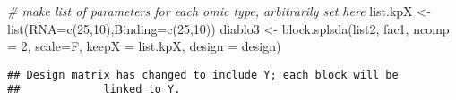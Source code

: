 \documentclass[
]{article}
\newenvironment{Shaded}{\begin{snugshade}}{\end{snugshade}}
\newcommand{\AttributeTok}[1]{\textcolor[rgb]{0.77,0.63,0.00}{#1}}
\newcommand{\CommentTok}[1]{\textcolor[rgb]{0.56,0.35,0.01}{\textit{#1}}}
\newcommand{\DecValTok}[1]{\textcolor[rgb]{0.00,0.00,0.81}{#1}}
\newcommand{\FunctionTok}[1]{\textcolor[rgb]{0.00,0.00,0.00}{#1}}
\newcommand{\NormalTok}[1]{#1}
\newcommand{\OtherTok}[1]{\textcolor[rgb]{0.56,0.35,0.01}{#1}}
\begin{document}
\begin{Shaded}
\begin{Highlighting}[]
\CommentTok{\# make list of parameters for each omic type, arbitrarily set here}
\NormalTok{list.kpX }\OtherTok{\textless{}{-}} \FunctionTok{list}\NormalTok{(}\AttributeTok{RNA=}\FunctionTok{c}\NormalTok{(}\DecValTok{25}\NormalTok{,}\DecValTok{10}\NormalTok{),}\AttributeTok{Binding=}\FunctionTok{c}\NormalTok{(}\DecValTok{25}\NormalTok{,}\DecValTok{10}\NormalTok{))}
\NormalTok{diablo3 }\OtherTok{\textless{}{-}} \FunctionTok{block.splsda}\NormalTok{(list2, fac1, }\AttributeTok{ncomp =} \DecValTok{2}\NormalTok{, }\AttributeTok{scale=}\NormalTok{F,}
                            \AttributeTok{keepX =}\NormalTok{ list.kpX, }\AttributeTok{design =}\NormalTok{ design)}
\end{Highlighting}
\end{Shaded}

\begin{verbatim}
## Design matrix has changed to include Y; each block will be
##             linked to Y.
\end{verbatim}
\end{document}
